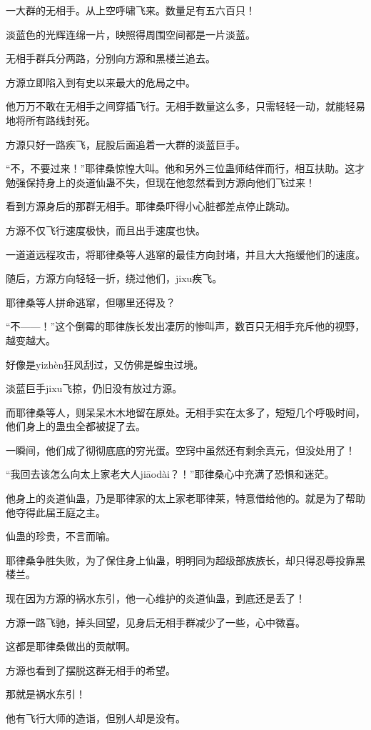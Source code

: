 \begin{this_body}
一大群的无相手。从上空呼啸飞来。数量足有五六百只！

淡蓝色的光辉连绵一片，映照得周围空间都是一片淡蓝。

无相手群兵分两路，分别向方源和黑楼兰追去。

方源立即陷入到有史以来最大的危局之中。

他万万不敢在无相手之间穿插飞行。无相手数量这么多，只需轻轻一动，就能轻易地将所有路线封死。

方源只好一路疾飞，屁股后面追着一大群的淡蓝巨手。

“不，不要过来！”耶律桑惊惶大叫。他和另外三位蛊师结伴而行，相互扶助。这才勉强保持身上的炎道仙蛊不失，但现在他忽然看到方源向他们飞过来！

看到方源身后的那群无相手。耶律桑吓得小心脏都差点停止跳动。

方源不仅飞行速度极快，而且出手速度也快。

一道道远程攻击，将耶律桑等人逃窜的最佳方向封堵，并且大大拖缓他们的速度。

随后，方源方向轻轻一折，绕过他们，jixu疾飞。

耶律桑等人拼命逃窜，但哪里还得及？

“不——！”这个倒霉的耶律族长发出凄厉的惨叫声，数百只无相手充斥他的视野，越变越大。

好像是yizhèn狂风刮过，又仿佛是蝗虫过境。

淡蓝巨手jixu飞掠，仍旧没有放过方源。

而耶律桑等人，则呆呆木木地留在原处。无相手实在太多了，短短几个呼吸时间，他们身上的蛊虫全都被捉了去。

一瞬间，他们成了彻彻底底的穷光蛋。空窍中虽然还有剩余真元，但没处用了！

“我回去该怎么向太上家老大人jiāodài？！”耶律桑心中充满了恐惧和迷茫。

他身上的炎道仙蛊，乃是耶律家的太上家老耶律莱，特意借给他的。就是为了帮助他夺得此届王庭之主。

仙蛊的珍贵，不言而喻。

耶律桑争胜失败，为了保住身上仙蛊，明明同为超级部族族长，却只得忍辱投靠黑楼兰。

现在因为方源的祸水东引，他一心维护的炎道仙蛊，到底还是丢了！

方源一路飞驰，掉头回望，见身后无相手群减少了一些，心中微喜。

这都是耶律桑做出的贡献啊。

方源也看到了摆脱这群无相手的希望。

那就是祸水东引！

他有飞行大师的造诣，但别人却是没有。


\end{this_body}
